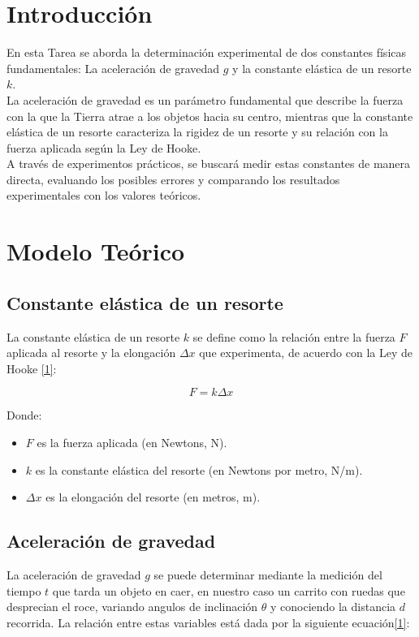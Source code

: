 \documentclass{article}
\begin{document}
\begin{multicols}{2}

\section{Introducción}

En esta Tarea se aborda la determinación experimental de
dos constantes físicas fundamentales: La aceleración de gravedad $g$
y la constante elástica de un resorte $k$.\\
La aceleración de gravedad es un parámetro fundamental que describe la
fuerza con la que la Tierra atrae a los objetos hacia su centro, mientras
que la constante elástica de un resorte caracteriza la rigidez de un resorte
y su relación  con la fuerza aplicada según la Ley de Hooke.\\
A través de experimentos prácticos, se buscará medir estas constantes de
manera directa, evaluando los posibles errores y comparando los resultados
experimentales con los valores teóricos.

\section{Modelo Teórico}

    \subsection{Constante elástica de un resorte}

        La constante elástica de un resorte $k$ se define como la relación entre la fuerza $F$ aplicada al
        resorte y la elongación $\Delta x$ que experimenta, de acuerdo con la Ley de Hooke \ref{1}:

            \begin{equation}
                F = k \Delta x
            \end{equation}

        Donde:
            \begin{itemize}
                \item $F$ es la fuerza aplicada (en Newtons, N).
                \item $k$ es la constante elástica del resorte (en Newtons por metro, N/m).
                \item $\Delta x$ es la elongación del resorte (en metros, m).
            \end{itemize}
    \subsection{Aceleración de gravedad}
        La aceleración de gravedad $g$ se puede determinar mediante la medición del tiempo $t$ que tarda 
        un objeto en caer, en nuestro caso un carrito con ruedas que desprecian el roce, variando angulos
        de inclinación $\theta$ y conociendo la distancia $d$ recorrida. La relación entre estas variables
        está dada por la siguiente ecuación\ref{1}:


\end{multicols}
\end{document}
